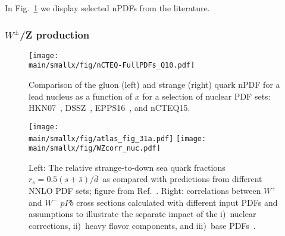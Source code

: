 \documentclass[../report.tex]{subfiles}
\providecommand{\main}{..}
\begin{document}
In Fig.~\ref{fig:npdf} we display selected nPDFs from the literature. 


\subsubsection{$W^\pm$/Z production}

\begin{figure}[tbh] %
\centering{} 
\texttt{[image: \\main/smallx/fig/nCTEQ-FullPDFs\_Q10.pdf]}
\caption{
Comparison of the gluon (left) and strange (right) quark nPDF for a lead nucleus as a function of $x$ for 
a selection of nuclear PDF sets:
HKN07~\cite{Hirai:2004wq}, DSSZ~\cite{deFlorian:2011fp}, EPPS16~\cite{Eskola:2016oht}, and nCTEQ15\cite{Kovarik:2015cma}.
}
\label{fig:npdf}
\end{figure}


\begin{figure}[t] %
\centering{} 
\texttt{[image: \\main/smallx/fig/atlas\_fig\_31a.pdf]}
\hfil
\texttt{[image: \\main/smallx/fig/WZcorr\_nuc.pdf]}
\caption{
Left: The relative strange-to-down sea quark fractions 
$r_s=0.5(s + \bar{s})/\bar{d}$\  as compared with  predictions from different NNLO PDF sets; figure from Ref.~\cite{Aaboud:2016btc}. 
\quad 
Right: correlations between $W^+$ and $W^-$ $pPb$  cross sections calculated with different input PDFs and assumptions   to illustrate the separate impact of the 
i)~nuclear corrections, ii)~heavy flavor components, and iii)~base PDFs~\cite{Kusina:2016fxy,Godat:2018kgp}.}
\label{fig:WZcorr}
\end{figure}

\end{document}
